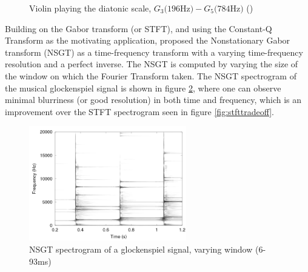 \documentclass[report.tex]{subfiles}
\begin{document}
\begin{figure}[ht]
	\centering
	\hspace{0.5em}
	\caption{Violin playing the diatonic scale, $G_{3} \text{(196Hz)} - G_{5} \text{(784Hz)}$ (\cite{jbrown})}
	\label{fig:violin}
\end{figure}

Building on the Gabor transform (or STFT), and using the Constant-Q Transform as the motivating application, \textcite{balazs} proposed the Nonstationary Gabor transform (NSGT) as a time-frequency transform with a varying time-frequency resolution and a perfect inverse. The NSGT is computed by varying the size of the window on which the Fourier Transform taken. The NSGT spectrogram of the musical glockenspiel signal is shown in figure \ref{fig:nsgttradeoff}, where one can observe minimal blurriness (or good resolution) in both time and frequency, which is an improvement over the STFT spectrogram seen in figure \ref{fig:stfttradeoff}.

\begin{figure}[ht]
	\centering
	\includegraphics[height=5cm]{./images-tftheory/tf_tradeoff_balasz3.png}
	\caption{NSGT spectrogram of a glockenspiel signal, varying window (6-93ms)}
	\label{fig:nsgttradeoff}
\end{figure}
\end{document}
